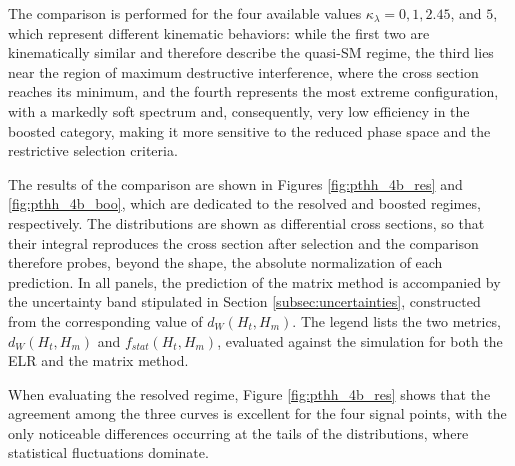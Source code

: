 The comparison is performed for the four available values $\kappa_\lambda = 0, 1, 2.45$, and $5$, which represent different kinematic behaviors: while the first two are kinematically similar and therefore describe the quasi-SM regime, the third lies near the region of maximum destructive interference, where the cross section reaches its minimum, and the fourth represents the most extreme configuration, with a markedly soft spectrum and, consequently, very low efficiency in the boosted category, making it more sensitive to the reduced phase space and the restrictive selection criteria.\medskip

The results of the comparison are shown in Figures \ref{fig:pthh_4b_res} and \ref{fig:pthh_4b_boo}, which are dedicated to the resolved and boosted regimes, respectively. The distributions are shown as differential cross sections, so that their integral reproduces the cross section after selection and the comparison therefore probes, beyond the shape, the absolute normalization of each prediction. In all panels, the prediction of the matrix method is accompanied by the uncertainty band stipulated in Section \ref{subsec:uncertainties}, constructed from the corresponding value of $d_W(H_{t},H_{m})$. The legend lists the two metrics, $d_W(H_{t},H_{m})$ and $f_{stat}(H_{t},H_{m})$, evaluated against the simulation for both the ELR and the matrix method.

When evaluating the resolved regime, Figure \ref{fig:pthh_4b_res} shows that the agreement among the three curves is excellent for the four signal points, with the only noticeable differences occurring at the tails of the distributions, where statistical fluctuations dominate.

